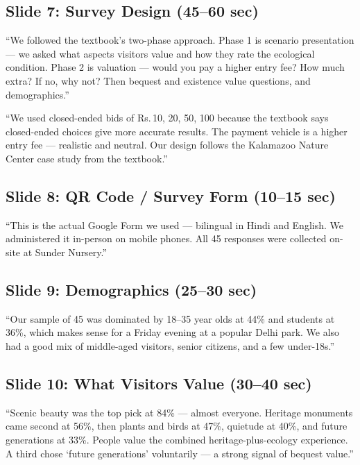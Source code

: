 \documentclass[11pt, a4paper]{article}
\newcommand{\rupee}{Rs.\,}
\newenvironment{ansbox}{%
    \def\FrameCommand{\textcolor{darkgreen}{\vrule width 2pt}\hspace{8pt}}%
    \MakeFramed{\advance\hsize-\width\FrameRestore}%
}{%
    \endMakeFramed%
}
\begin{document}
\subsection{Slide 7: Survey Design \normalfont\small(45--60 sec)}
\begin{ansbox}
``We followed the textbook's two-phase approach. Phase 1 is scenario presentation --- we asked what aspects visitors value and how they rate the ecological condition. Phase 2 is valuation --- would you pay a higher entry fee? How much extra? If no, why not? Then bequest and existence value questions, and demographics.''

``We used closed-ended bids of \rupee 10, 20, 50, 100 because the textbook says closed-ended choices give more accurate results. The payment vehicle is a higher entry fee --- realistic and neutral. Our design follows the Kalamazoo Nature Center case study from the textbook.''
\end{ansbox}

\subsection{Slide 8: QR Code / Survey Form \normalfont\small(10--15 sec)}
\begin{ansbox}
``This is the actual Google Form we used --- bilingual in Hindi and English. We administered it in-person on mobile phones. All 45 responses were collected on-site at Sunder Nursery.''
\end{ansbox}

\subsection{Slide 9: Demographics \normalfont\small(25--30 sec)}
\begin{ansbox}
``Our sample of 45 was dominated by 18--35 year olds at 44\% and students at 36\%, which makes sense for a Friday evening at a popular Delhi park. We also had a good mix of middle-aged visitors, senior citizens, and a few under-18s.''
\end{ansbox}

\subsection{Slide 10: What Visitors Value \normalfont\small(30--40 sec)}
\begin{ansbox}
``Scenic beauty was the top pick at 84\% --- almost everyone. Heritage monuments came second at 56\%, then plants and birds at 47\%, quietude at 40\%, and future generations at 33\%. People value the combined heritage-plus-ecology experience. A third chose `future generations' voluntarily --- a strong signal of bequest value.''
\end{ansbox}
\end{document}
